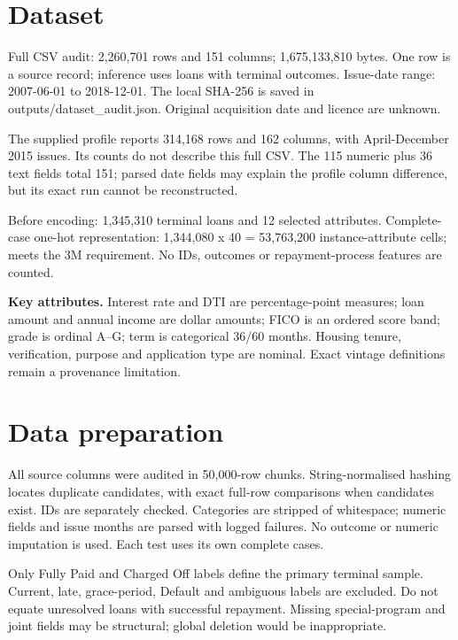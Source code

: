 \documentclass[10pt,a4paper,twocolumn]{article}
\begin{document}
\section{Dataset}
Full CSV audit: 2,260,701 rows and 151 columns; 1,675,133,810 bytes. One row is a source record; inference uses loans with terminal outcomes. Issue-date range: 2007-06-01 to 2018-12-01. The local SHA-256 is saved in outputs/dataset\_audit.json. Original acquisition date and licence are unknown.

The supplied profile reports 314,168 rows and 162 columns, with April-December 2015 issues. Its counts do not describe this full CSV. The 115 numeric plus 36 text fields total 151; parsed date fields may explain the profile column difference, but its exact run cannot be reconstructed.

Before encoding: 1,345,310 terminal loans and 12 selected attributes. Complete-case one-hot representation: 1,344,080 x 40 = 53,763,200 instance-attribute cells; meets the 3M requirement. No IDs, outcomes or repayment-process features are counted.

\textbf{Key attributes.} Interest rate and DTI are percentage-point measures; loan amount and annual income are dollar amounts; FICO is an ordered score band; grade is ordinal A--G; term is categorical 36/60 months. Housing tenure, verification, purpose and application type are nominal. Exact vintage definitions remain a provenance limitation.
\section{Data preparation}
All source columns were audited in 50,000-row chunks. String-normalised hashing locates duplicate candidates, with exact full-row comparisons when candidates exist. IDs are separately checked. Categories are stripped of whitespace; numeric fields and issue months are parsed with logged failures. No outcome or numeric imputation is used. Each test uses its own complete cases.

Only Fully Paid and Charged Off labels define the primary terminal sample. Current, late, grace-period, Default and ambiguous labels are excluded. Do not equate unresolved loans with successful repayment. Missing special-program and joint fields may be structural; global deletion would be inappropriate.
\end{document}
